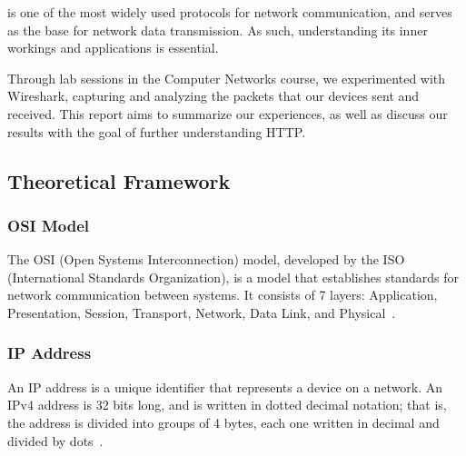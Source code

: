 % 
% 
% 
% 
 is one of the most widely used protocols for network communication, and
serves as the base for network data transmission. As such, understanding its inner workings and
applications is essential.

Through lab sessions in the Computer Networks course, we experimented with
Wireshark, capturing and analyzing the packets that our devices sent and
received. This report aims to summarize our experiences, as well as discuss our
results with the goal of further understanding HTTP.\@



\subsection{Theoretical Framework}

\subsubsection{OSI Model}
The OSI (Open Systems Interconnection) model, developed by the ISO
(International Standards Organization), is a model that establishes standards
for network communication between systems. It consists of 7 layers:
Application, Presentation, Session, Transport, Network, Data Link, and
Physical~\cite{tanenbaum:networks}.

\subsubsection{IP Address}
An IP address is a unique identifier that represents a device on a network. An
IPv4 address is 32 bits long, and is written in dotted decimal notation; that
is, the address is divided into groups of 4 bytes, each one written in decimal
and divided by dots~\cite{tanenbaum:networks}.

